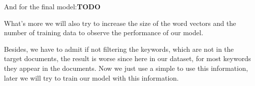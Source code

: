 \documentclass[dvips,9pt]{article}
\begin{document}
    And for the final model:\textbf{TODO}
    
    What's more we will also try to increase the size of the word vectors and the number of training data to observe the performance of our model.
    
    Besides, we have to admit if not filtering the keywords, which are not in the target documents, the result is worse since here in our dataset, for most keywords they appear in the documents. Now we just use a simple to use this information, later we will try to train our model with this information.
	
	
\end{document}
